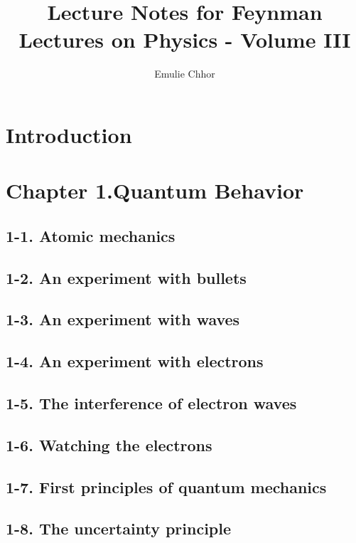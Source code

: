 \documentclass{article}
\begin{document}
\title{Lecture Notes for Feynman Lectures on Physics - Volume III}
\author{Emulie Chhor}
\maketitle

\section*{Introduction}

\newtheorem{definition}{Definition}[subsection]
\newtheorem{theorem}{Theorem}[subsection]
\newtheorem{corollary}{Corollary}[subsection]
\newtheorem{lemma}[theorem]{Lemma}
\newtheorem{proposition}{Proposition}[section]
\newtheorem{axiom}{Axiome}
\newtheorem{property}{Propriété}[subsection]
\newtheorem*{remark}{Remarque}
\newtheorem*{problem}{Problème}
\newtheorem*{intuition}{Intuition}

\section{Chapter 1.Quantum Behavior}
\subsection{1-1. Atomic mechanics}
\subsection{1-2. An experiment with bullets}
\subsection{1-3. An experiment with waves}
\subsection{1-4. An experiment with electrons}
\subsection{1-5. The interference of electron waves}
\subsection{1-6. Watching the electrons}
\subsection{1-7. First principles of quantum mechanics}
\subsection{1-8. The uncertainty principle}
\end{document}
